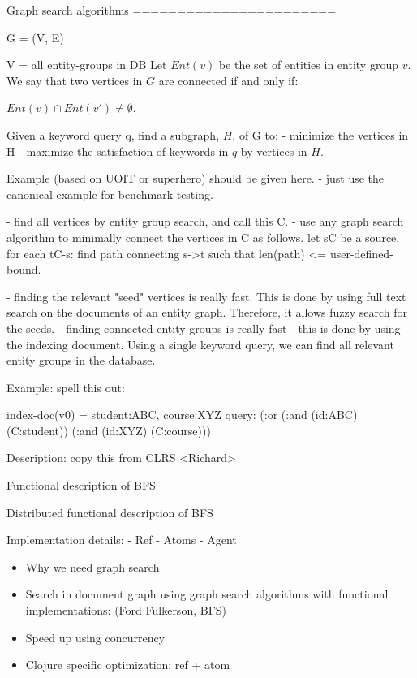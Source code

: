 		
		Graph search algorithms
		=======================
		
		
		G = (V, E)
		
		V = all entity-groups in DB
		Let $Ent(v)$ be the set of entities in entity group $v$.
		We say that two vertices in $G$ are connected if and only if:
		
		$Ent(v)\cap Ent(v')\not=\emptyset$.
		
		
		Given a keyword query q, find a subgraph, $H$, of G to:
		- minimize the vertices in H
		- maximize the satisfaction of keywords in $q$ by vertices in $H$.
		
		Example (based on UOIT or superhero) should be given here.
		- just use the canonical example for benchmark testing.
		
		
		- find all vertices by entity group search, and call this C.
		- use any graph search algorithm to minimally connect the vertices in C
		as follows. 
		let s\in C be a source.
		for each t\in C-{s}:
		find path connecting s->t such that len(path) <= user-defined-bound.
		
		
		- finding the relevant "seed" vertices is really fast.  This is done by
		using full text search on the documents of an entity graph.  Therefore, it
		allows fuzzy search for the seeds.
		- finding connected entity groups is really fast - this is done by using the
		indexing document.  Using a single keyword query, we can find all relevant
		entity groups in the database.
		
		Example: spell this out:
		
		index-doc(v0) = student:ABC, course:XYZ
		query: (:or (:and (id:ABC) (C:student)) 
		(:and (id:XYZ) (C:course)))
		
		
		Description: copy this from CLRS
		<Richard>
		
		Functional description of BFS
		
		Distributed functional description of BFS
		
		Implementation details:
		- Ref
		- Atoms
		- Agent
		
		\begin{itemize}
			\item Why we need graph search
			\item Search in document graph using graph search algorithms with functional implementations: (Ford Fulkerson, BFS)
			\item Speed up using concurrency
			\item Clojure specific optimization: ref + atom
		\end{itemize}